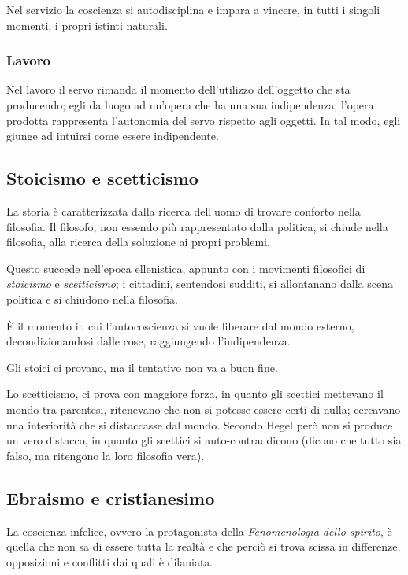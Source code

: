 \documentclass[a4paper, twoside, titlepage]{book}
\begin{document}
Nel servizio la coscienza si autodisciplina e impara a vincere, in tutti i singoli momenti, i propri istinti naturali.

\subsubsection{Lavoro}

Nel lavoro il servo rimanda il momento dell'utilizzo dell'oggetto che sta producendo; egli da luogo ad un'opera che ha una sua indipendenza; l'opera prodotta rappresenta l'autonomia del servo rispetto agli oggetti.
In tal modo, egli giunge ad intuirsi come essere indipendente.

\subsection{Stoicismo e scetticismo}

La storia è caratterizzata dalla ricerca dell'uomo di trovare conforto nella filosofia. Il filosofo, non essendo più rappresentato dalla politica, si chiude nella filosofia, alla ricerca della soluzione ai propri problemi.

Questo succede nell'epoca ellenistica, appunto con i movimenti filosofici di \textit{stoicismo} e \textit{scetticismo}; i cittadini, sentendosi sudditi, si allontanano dalla scena politica e si chiudono nella filosofia.

È il momento in cui l'autocoscienza si vuole liberare dal mondo esterno, decondizionandosi dalle cose, raggiungendo l'indipendenza.

Gli stoici ci provano, ma il tentativo non va a buon fine.

Lo scetticismo, ci prova con maggiore forza, in quanto gli scettici mettevano il mondo tra parentesi, ritenevano che non si potesse essere certi di nulla; cercavano una interiorità che si distaccasse dal mondo. Secondo Hegel però non si produce un vero distacco, in quanto gli scettici si auto-contraddicono (dicono che tutto sia falso, ma ritengono la loro filosofia vera).

\subsection{Ebraismo e cristianesimo}

La coscienza infelice, ovvero la protagonista della \textit{Fenomenologia dello spirito}, è quella che non sa di essere tutta la realtà e che perciò si trova scissa in differenze, opposizioni e conflitti dai quali è dilaniata.
\end{document}
